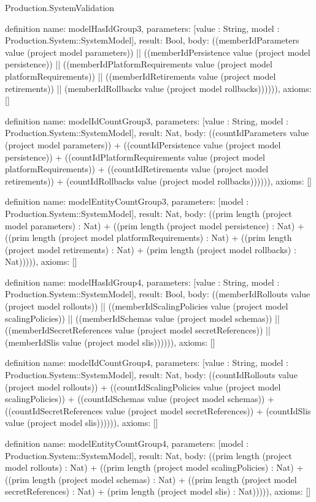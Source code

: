 \begin{lexlean}{Production.SystemValidation}
\begin{semanticmodule}
definition{
  name: modelHasIdGroup3,
  parameters: [value : String, model : Production.System::SystemModel],
  result: Bool,
  body: ((memberIdParameters value (project model parameters)) || ((memberIdPersistence value (project model persistence)) || ((memberIdPlatformRequirements value (project model platformRequirements)) || ((memberIdRetirements value (project model retirements)) || (memberIdRollbacks value (project model rollbacks)))))),
  axioms: []
}

definition{
  name: modelIdCountGroup3,
  parameters: [value : String, model : Production.System::SystemModel],
  result: Nat,
  body: ((countIdParameters value (project model parameters)) + ((countIdPersistence value (project model persistence)) + ((countIdPlatformRequirements value (project model platformRequirements)) + ((countIdRetirements value (project model retirements)) + (countIdRollbacks value (project model rollbacks)))))),
  axioms: []
}

definition{
  name: modelEntityCountGroup3,
  parameters: [model : Production.System::SystemModel],
  result: Nat,
  body: ((prim length (project model parameters) : Nat) + ((prim length (project model persistence) : Nat) + ((prim length (project model platformRequirements) : Nat) + ((prim length (project model retirements) : Nat) + (prim length (project model rollbacks) : Nat))))),
  axioms: []
}

definition{
  name: modelHasIdGroup4,
  parameters: [value : String, model : Production.System::SystemModel],
  result: Bool,
  body: ((memberIdRollouts value (project model rollouts)) || ((memberIdScalingPolicies value (project model scalingPolicies)) || ((memberIdSchemas value (project model schemas)) || ((memberIdSecretReferences value (project model secretReferences)) || (memberIdSlis value (project model slis)))))),
  axioms: []
}

definition{
  name: modelIdCountGroup4,
  parameters: [value : String, model : Production.System::SystemModel],
  result: Nat,
  body: ((countIdRollouts value (project model rollouts)) + ((countIdScalingPolicies value (project model scalingPolicies)) + ((countIdSchemas value (project model schemas)) + ((countIdSecretReferences value (project model secretReferences)) + (countIdSlis value (project model slis)))))),
  axioms: []
}

definition{
  name: modelEntityCountGroup4,
  parameters: [model : Production.System::SystemModel],
  result: Nat,
  body: ((prim length (project model rollouts) : Nat) + ((prim length (project model scalingPolicies) : Nat) + ((prim length (project model schemas) : Nat) + ((prim length (project model secretReferences) : Nat) + (prim length (project model slis) : Nat))))),
  axioms: []
}


\end{semanticmodule}
\end{lexlean}

